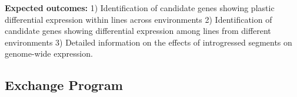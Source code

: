 {\bf Expected outcomes:} 1) Identification of candidate genes showing plastic differential expression within lines across environments 2) Identification of candidate genes showing differential expression among lines from different environments 3) Detailed information on the effects of introgressed segments on genome-wide expression. 




\subsection*{Exchange Program} 

